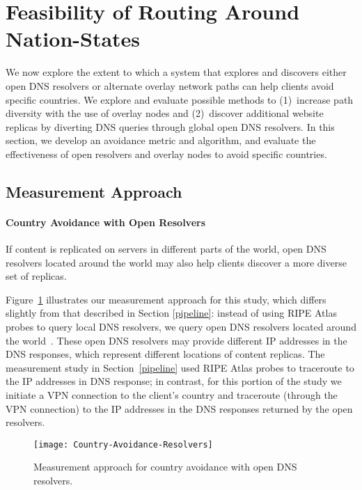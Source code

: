 \section{Feasibility of Routing Around Nation-States}
\label{avoid_results}

We now explore the extent
to which a system that explores and discovers either open DNS resolvers or alternate overlay network paths
can help clients avoid specific countries. We explore and evaluate possible
methods to (1)~increase path diversity with the use of overlay nodes and
(2)~discover additional website replicas by diverting DNS queries through
global open DNS resolvers.  In this section, we develop an avoidance metric and algorithm, and
evaluate the effectiveness of open resolvers and overlay nodes to avoid specific countries.

\subsection{Measurement Approach}
\label{avoid_pipelines}

\paragraph{Country Avoidance with Open Resolvers} If content is
replicated on servers in different parts of the world, open DNS
resolvers located 
around the world may also help clients discover a more diverse set of
replicas.  

Figure~\ref{fig:avoidance_resolvers} illustrates our measurement
approach for this study, which differs slightly from that described in
Section \ref{pipeline}: instead of using RIPE Atlas probes to query
local DNS resolvers, we query open DNS resolvers located around the
world~\cite{open_resolver_list}.  These open DNS resolvers may provide
different IP addresses in the DNS responses, which represent different
locations of content replicas. The measurement study in
Section~\ref{pipeline} used RIPE Atlas probes to traceroute to the IP
addresses in DNS response; in contrast, for this portion of the study we
initiate a VPN connection to the client's country and traceroute
(through the VPN connection) to the IP addresses in the DNS responses
returned by the open resolvers.

\begin{figure}[t]
\centering
\texttt{[image: Country-Avoidance-Resolvers]}
\caption{Measurement approach for country avoidance with open DNS resolvers.}
\label{fig:avoidance_resolvers}
\end{figure}

